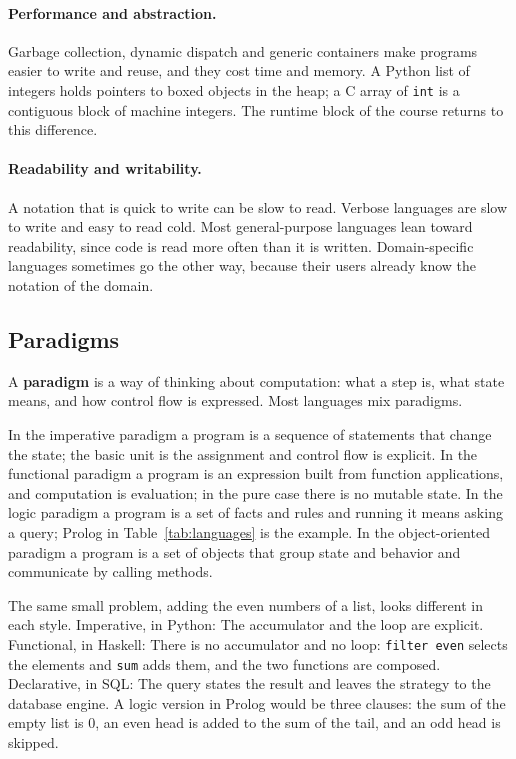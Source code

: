 \paragraph{Performance and abstraction.} Garbage collection, dynamic dispatch
and generic containers make programs easier to write and reuse, and they cost
time and memory. A Python list of integers holds pointers to boxed objects in
the heap; a C array of \texttt{int} is a contiguous block of machine integers.
The runtime block of the course returns to this difference.

\paragraph{Readability and writability.} A notation that is quick to write can
be slow to read. Verbose languages are slow to write and easy to read cold.
Most general-purpose languages lean toward readability, since code is read
more often than it is written. Domain-specific languages sometimes go the other
way, because their users already know the notation of the domain.

\subsection{Paradigms}

A \textbf{paradigm} is a way of thinking about computation: what a step is,
what state means, and how control flow is expressed. Most languages mix
paradigms.

In the imperative paradigm a program is a sequence of statements that change
the state; the basic unit is the assignment and control flow is explicit.
In the functional paradigm a program is an expression built from function
applications, and computation is evaluation; in the pure case there is no
mutable state. In the logic paradigm a program is a set of facts and rules and
running it means asking a query; Prolog in Table~\ref{tab:languages} is the
example. In the object-oriented paradigm a program is a set of objects that
group state and behavior and communicate by calling methods.

The same small problem, adding the even numbers of a list, looks different in
each style. Imperative, in Python:
The accumulator and the loop are explicit. Functional, in Haskell:
There is no accumulator and no loop: \texttt{filter even} selects the
elements and \texttt{sum} adds them, and the two functions are composed.
Declarative, in SQL:
The query states the result and leaves the strategy to the database engine.
A logic version in Prolog would be three clauses: the sum of the empty list is
0, an even head is added to the sum of the tail, and an odd head is skipped.

